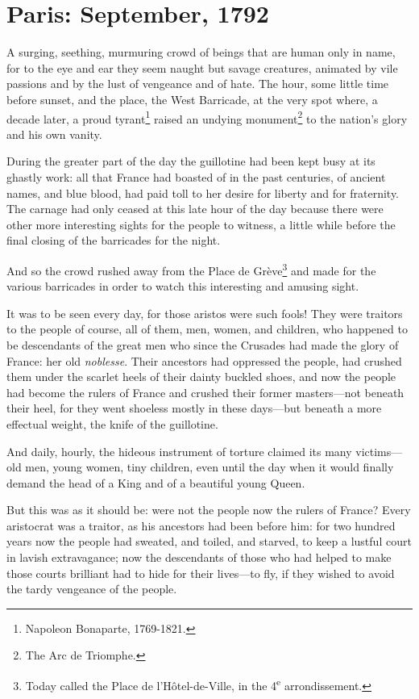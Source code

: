 \chapter{Paris: September, 1792}
\lettrine[lines=4]{A}{} surging, seething, murmuring crowd of beings that are human only in name, for to the eye and ear they seem naught but savage creatures, animated by vile passions and by the lust of vengeance and of hate. The hour, some little time before sunset, and the place, the West Barricade, at the very spot where, a decade later, a proud tyrant\footnote{Napoleon Bonaparte, 1769-1821.} raised an undying monument\footnote{The Arc de Triomphe.} to the nation's glory and his own vanity.

During the greater part of the day the guillotine had been kept busy at its ghastly work: all that France had boasted of in the past centuries, of ancient names, and blue blood, had paid toll to her desire for liberty and for fraternity. The carnage had only ceased at this late hour of the day because there were other more interesting sights for the people to witness, a little while before the final closing of the barricades for the night.

And so the crowd rushed away from the Place de Grève\footnote{Today called the Place de l'Hôtel-de-Ville, in the 4\textsuperscript{e} arrondissement.} and made for the various barricades in order to watch this interesting and amusing sight.

It was to be seen every day, for those aristos were such fools! They were traitors to the people of course, all of them, men, wo\-men, and children, who happened to be descendants of the great men who since the Crusades had made the glory of France: her old \textit{noblesse}. Their ancestors had oppressed the people, had crushed them under the scarlet heels of their dainty buckled shoes, and now the people had become the rulers of France and crushed their former masters---not beneath their heel, for they went shoeless mostly in these days---but beneath a more effectual weight, the knife of the guillotine.

And daily, hourly, the hideous instrument of torture claimed its many victims---old men, young women, tiny children, even until the day when it would finally demand the head of a King and of a beautiful young Queen.

But this was as it should be: were not the people now the rulers of France? Every aristocrat was a traitor, as his ancestors had been before him: for two hundred years now the people had sweated, and toiled, and starved, to keep a lustful court in lavish extravagance; now the descendants of those who had helped to make those courts brilliant had to hide for their lives---to fly, if they wished to avoid the tardy vengeance of the people.

